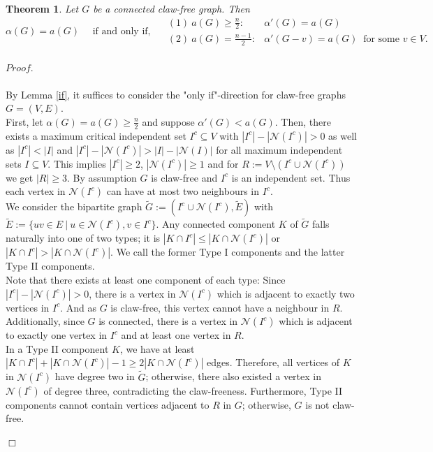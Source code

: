 \documentclass{scrartcl}
\newtheorem{theorem}[defsatzusw]{Theorem}
\newenvironment{proof}{\paragraph{$\mathit{Proof.}$}
	\vspace{-.4cm}\hspace{-.3cm}}{\vspace{-.2cm}\begin{flushright}$\Box$\end{flushright}}
\begin{document}
	\begin{theorem}
		Let $G$ be a connected claw-free graph. Then $$\alpha(G)=a(G) \quad\text{ if and only if, }\quad	
		\begin{array}{ll}
			(1)~ a(G)\geq \frac n2:& \alpha'(G)=a(G)\\[2mm]
			(2)~ a(G)= \frac{n-1}{2}:& \alpha'(G-v)=a(G) ~\text{ for some } v\in V.
		\end{array}$$
	\end{theorem}
	\begin{proof}
		By Lemma \ref{if}, it suffices to consider the "only if"-direction for claw-free graphs $G=(V,E)$.\\
		First, let $\alpha(G)=a(G)\geq\frac n2$ and suppose $\alpha'(G)<a(G)$.
		Then, there exists a maximum critical independent set $I^c\subseteq V$ with $|I^c|-|\mathcal{N}(I^c)|>0$ as well as $|I^c|<|I|$ and $|I^c|-|\mathcal{N}(I^c)|>|I|-|\mathcal{N}(I)|$ for all maximum independent sets $I\subseteq V$.
		This implies $|I^c|\geq2$, $|\mathcal{N}(I^c)|\geq1$ and for $R:=V\setminus(I^c\cup\mathcal{N}(I^c))$ we get $|R|\geq3$.
		By assumption $G$ is claw-free and $I^c$ is an independent set. 
		Thus each vertex in $\mathcal{N}(I^c)$ can have at most two neighbours in $I^c$.\\
		We consider the bipartite graph $\tilde{G}:=(I^c\cup\mathcal{N}(I^c), \tilde{E})$ with $\tilde{E}:=\{uv\in E~|~u\in \mathcal{N}(I^c),v\in I^c\}$.
		Any connected component $K$ of $\tilde{G}$ falls naturally into one of two types; it is 
		$|K\cap I^c|\leq|K\cap\mathcal{N}(I^c)|$ or 
		$|K\cap I^c|>|K\cap\mathcal{N}(I^c)|$. 
		We call the former Type I components and the latter Type II components.\\
		Note that there exists at least one component of each type: 
		Since $|I^c|-|\mathcal{N}(I^c)|>0$, there is a vertex in $\mathcal{N}(I^c)$ which is adjacent to exactly two vertices in $I^c$. And as $G$ is claw-free, this vertex cannot have a neighbour in $R$.
		Additionally, since $G$ is connected, there is a vertex in $\mathcal{N}(I^c)$ which is adjacent to exactly one vertex in $I^c$ and at least one vertex in $R$.\\
		In a Type II component $K$, we have at least $|K\cap I^c|+|K\cap\mathcal{N}(I^c)|-1\geq2|K\cap\mathcal{N}(I^c)|$ edges. 
		Therefore, all vertices of $K$ in $\mathcal{N}(I^c)$ have degree two in $\tilde{G}$; otherwise, there also existed a vertex in $\mathcal{N}(I^c)$ of degree three, contradicting the claw-freeness.
		Furthermore, Type II components cannot contain vertices adjacent to $R$ in $G$; otherwise, $G$ is not claw-free. 

\end{proof}
\end{document}
